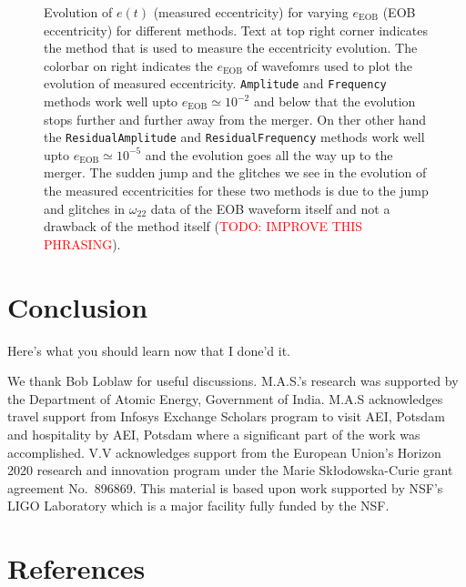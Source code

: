 \documentclass[aps,prd,amsmath,floats,floatfix, twocolumn,
superscriptaddress,nofootinbib,showpacs]{revtex4-1}
\newcommand{\red}{\textcolor{red}}
\newcommand{\TODO}[1]{\red{TODO: #1}}
\begin{document}
\begin{figure}[thb]
\caption{
  Evolution of $e(t)$ (measured eccentricity) for varying
  $e_{\text{EOB}}$ (EOB eccentricity) for different methods. Text at top
  right corner indicates the method that is used to measure the
  eccentricity evolution. The colorbar on right indicates the
  $e_{\text{EOB}}$ of wavefomrs used to plot the evolution of measured
  eccentricity. \texttt{Amplitude} and \texttt{Frequency} methods work
  well upto $e_{\text{EOB}} \simeq 10^{-2}$ and below that the evolution
  stops further and further away from the merger. On ther other hand the
  \texttt{ResidualAmplitude} and \texttt{ResidualFrequency} methods work
  well upto $e_{\text{EOB}} \simeq 10^{-5}$ and the evolution goes all
  the way up to the merger. The sudden jump and the glitches we see in
  the evolution of the measured eccentricities for these two methods is
  due to the jump and glitches in $\omega_{22}$ data of the EOB waveform
  itself and not a drawback of the method itself (\TODO{IMPROVE THIS
  PHRASING}).
}
\label{fig:measured_ecc_vs_time}
\end{figure}

\section{Conclusion}
\label{sec:conclusion}
Here's what you should learn now that I done'd it.


\begin{acknowledgments}
We thank Bob Loblaw for useful discussions.
M.A.S.’s research was supported by the Department of Atomic Energy,
Government of India. M.A.S acknowledges travel support from Infosys
Exchange Scholars program to visit AEI, Potsdam and hospitality by
AEI, Potsdam where a significant part of the work was accomplished.
V.V acknowledges support from the European Union’s Horizon 2020
research and innovation program under the Marie Skłodowska-Curie grant
agreement No.~896869.
This material is based upon work supported by NSF's LIGO Laboratory
which is a major facility fully funded by the NSF.
\end{acknowledgments}

\section*{References}

\end{document}

